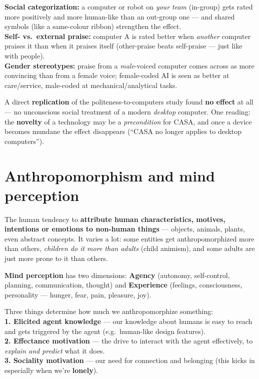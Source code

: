 \documentclass[11pt, oneside]{book}
\begin{document}
\begin{exbox}[title={Classic CASA findings}]
\textbf{Social categorization:} a computer or robot on \emph{your team}
(in-group) gets rated more positively and more human-like than an out-group
one — and shared symbols (like a same-colour ribbon) strengthen the effect.\\
\textbf{Self- vs.\ external praise:} computer A is rated better when
\emph{another} computer praises it than when it praises itself (other-praise
beats self-praise — just like with people).\\
\textbf{Gender stereotypes:} praise from a \emph{male}-voiced computer comes
across as more convincing than from a female voice; female-coded AI is seen as
better at care/service, male-coded at mechanical/analytical tasks.
\end{exbox}

\begin{notebox}[title={CASA might be fading}]
A direct \textbf{replication} of the politeness-to-computers study found
\textbf{no effect} at all — no unconscious social treatment of a modern
\emph{desktop} computer. One reading: the \textbf{novelty} of a technology may
be a \emph{precondition} for CASA, and once a device becomes mundane the effect
disappears (``CASA no longer applies to desktop computers'').
\end{notebox}

\section{Anthropomorphism and mind perception}

\begin{defbox}[title={Anthropomorphism}]
The human tendency to \textbf{attribute human characteristics, motives,
intentions or emotions to non-human things} — objects, animals, plants, even
abstract concepts. It varies a lot: some entities get anthropomorphized more
than others, \emph{children do it more than adults} (child animism), and some
adults are just more prone to it than others.
\end{defbox}

\textbf{Mind perception} has two dimensions: \textbf{Agency} (autonomy,
self-control, planning, communication, thought) and \textbf{Experience}
(feelings, consciousness, personality — hunger, fear, pain, pleasure, joy).

\begin{thmbox}[title={Three-Factor Theory of Anthropomorphism}]
Three things determine how much we anthropomorphize something:\\
\textbf{1. Elicited agent knowledge} — our knowledge about humans is easy to
reach and gets triggered by the agent (e.g.\ human-like design features).\\
\textbf{2. Effectance motivation} — the drive to interact with the agent
effectively, to \emph{explain and predict} what it does.\\
\textbf{3. Sociality motivation} — our need for connection and belonging
(this kicks in especially when we're \textbf{lonely}).
\end{thmbox}
\end{document}
